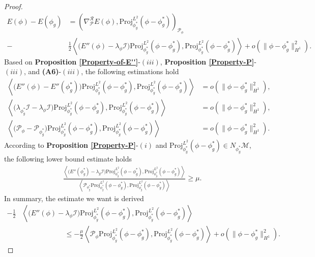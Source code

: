 \documentclass[preprint,3p]{elsarticle}
\begin{document}
\begin{proof}
	\begin{align}\label{P-L2}
		\nonumber E(\phi)-E(\phi_g)&=\left(\nabla^{\mathcal{R}}_{\mathcal{P}} E(\phi),\text{Proj}^{L^2}_{\phi_g^*}(\phi-\phi_g^*)\right)_{\mathcal{P}_{\phi}}\\
		-&\frac{1}{2}\left\langle \big(E''(\phi)-\lambda_{\phi}\mathcal{I}\big)\text{Proj}^{L^2}_{\phi_g^*}(\phi-\phi_g^*),\text{Proj}^{L^2}_{\phi_g^*}(\phi-\phi_g^*)\right\rangle+o\left(\|\phi-\phi_g^*\|^2_{H^1}\right).
	\end{align}
	Based on {\bf Proposition \ref{Property-of-E''}}-$(iii)$, {\bf Proposition \ref{Property-P}}-$(iii)$, and {\bf (A6)}-$(iii)$, the following estimations hold
	\begin{align*}
		\left\langle \big(E''(\phi)-E''(\phi_g^*)\big)\text{Proj}^{L^2}_{\phi_g^*}(\phi-\phi_g^*),\text{Proj}^{L^2}_{\phi_g^*}(\phi-\phi_g^*)\right\rangle&=o\left(\|\phi-\phi_g^*\|^2_{H^1}\right),\\
		\left\langle \big(\lambda_{\phi_g^*}\mathcal{I}-\lambda_{\phi}\mathcal{I}\big)\text{Proj}^{L^2}_{\phi_g^*}(\phi-\phi_g^*),\text{Proj}^{L^2}_{\phi_g^*}(\phi-\phi_g^*)\right\rangle&=o\left(\|\phi-\phi_g^*\|^2_{H^1}\right),\\
		\left\langle\big(\mathcal{P}_{\phi}-\mathcal{P}_{\phi_g^*}\big)\text{Proj}^{L^2}_{\phi_g^*}(\phi-\phi_g^*),\text{Proj}^{L^2}_{\phi_g^*}(\phi-\phi_g^*)\right\rangle&=o\left(\|\phi-\phi_g^*\|^2_{H^1}\right).
	\end{align*}
	According to {\bf Proposition \ref{Property-P}}-$(i)$ and $\text{Proj}^{L^2}_{\phi_g^*}(\phi-\phi_g^*)\in N_{\phi_g^*}\mathcal{M}$, the following lower bound estimate holds
	\begin{align*}
		\frac{\left\langle\big( E''(\phi_g^*)-\lambda_{g}\mathcal{I}\big)\text{Proj}^{L^2}_{\phi_g^*}(\phi-\phi_g^*),\text{Proj}^{L^2}_{\phi_g^*}(\phi-\phi_g^*)\right\rangle}{\left\langle\mathcal{P}_{\phi_g^*}\text{Proj}^{L^2}_{\phi_g^*}(\phi-\phi_g^*),\text{Proj}^{L^2}_{\phi_g^*}(\phi-\phi_g^*)\right\rangle}\ge\mu.
	\end{align*}
	In summary, the estimate we want is derived
	\begin{align*}
		-\frac{1}{2}&\left\langle \big(E''(\phi)-\lambda_{\phi}\mathcal{I}\big)\text{Proj}^{L^2}_{\phi_g^*}(\phi-\phi_g^*),\text{Proj}^{L^2}_{\phi_g^*}(\phi-\phi_g^*)\right\rangle\\
		&\qquad\qquad\qquad\le-\frac{\mu}{2}\left\langle\mathcal{P}_{\phi}\text{Proj}^{L^2}_{\phi_g^*}(\phi-\phi_g^*),\text{Proj}^{L^2}_{\phi_g^*}(\phi-\phi_g^*)\right\rangle
		+o\left(\|\phi-\phi_g^*\|^2_{H^1}\right).

\end{align*}
\end{proof}
\end{document}
